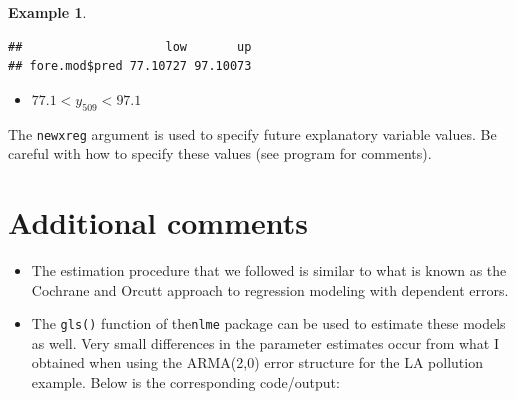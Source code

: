 \documentclass[
]{book}
\newenvironment{Shaded}{\begin{snugshade}}{\end{snugshade}}
\newcommand{\AttributeTok}[1]{\textcolor[rgb]{0.77,0.63,0.00}{#1}}
\newcommand{\CommentTok}[1]{\textcolor[rgb]{0.56,0.35,0.01}{\textit{#1}}}
\newcommand{\DecValTok}[1]{\textcolor[rgb]{0.00,0.00,0.81}{#1}}
\newcommand{\FloatTok}[1]{\textcolor[rgb]{0.00,0.00,0.81}{#1}}
\newcommand{\FunctionTok}[1]{\textcolor[rgb]{0.00,0.00,0.00}{#1}}
\newcommand{\NormalTok}[1]{#1}
\newcommand{\OtherTok}[1]{\textcolor[rgb]{0.56,0.35,0.01}{#1}}
\newcommand{\SpecialCharTok}[1]{\textcolor[rgb]{0.00,0.00,0.00}{#1}}
\providecommand{\tightlist}{%
  \setlength{\itemsep}{0pt}\setlength{\parskip}{0pt}}
\theoremstyle{definition}
\theoremstyle{definition}
\newtheorem{example}{Example}[chapter]
\theoremstyle{definition}
\theoremstyle{definition}
\theoremstyle{remark}
\begin{document}
\begin{example}
\begin{Shaded}
\end{Shaded}

\begin{verbatim}
##                    low       up
## fore.mod$pred 77.10727 97.10073
\end{verbatim}

\begin{itemize}
\tightlist
\item
  \(77.1<y_{509}<97.1\)
\end{itemize}

The \texttt{newxreg} argument is used to specify future explanatory variable values. Be careful with how to specify these values (see program for comments).
\end{example}

\hypertarget{additional-comments}{%
\section{Additional comments}\label{additional-comments}}

\begin{itemize}
\item
  The estimation procedure that we followed is similar to what is known as the Cochrane and Orcutt approach to regression modeling with dependent errors.
\item
  The \texttt{gls()} function of the\texttt{nlme} package can be used to estimate these models as well. Very small differences in the parameter estimates occur from what I obtained when using the ARMA(2,0) error structure for the LA pollution example. Below is the corresponding code/output:
\end{itemize}
\end{document}
